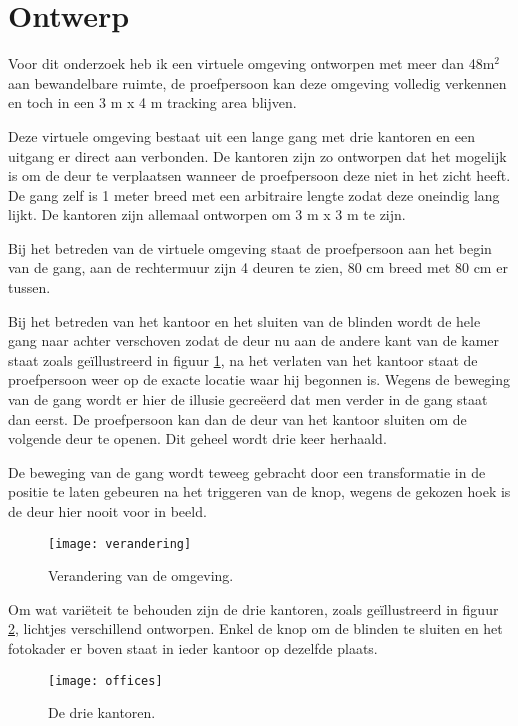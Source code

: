 \section{Ontwerp}
Voor dit onderzoek heb ik een virtuele omgeving ontworpen met meer dan 48m$^2$
aan bewandelbare ruimte, de proefpersoon kan deze omgeving volledig verkennen en
toch in een 3 m x 4 m tracking area blijven.

Deze virtuele omgeving bestaat uit een lange gang met drie kantoren en een 
uitgang er direct aan verbonden. De kantoren zijn zo ontworpen dat het mogelijk 
is om de deur te verplaatsen wanneer de proefpersoon deze niet in het zicht
heeft. De gang zelf is 1 meter breed met een arbitraire lengte zodat deze
oneindig lang lijkt. De kantoren zijn allemaal ontworpen om 3 m x 3 m te zijn.

Bij het betreden van de virtuele omgeving staat de proefpersoon aan het begin van
de gang, aan de rechtermuur zijn 4 deuren te zien, 80 cm breed met 80 cm er
tussen.

Bij het betreden van het kantoor en het sluiten van de blinden wordt de hele 
gang naar achter verschoven zodat de deur nu aan de andere kant van de kamer 
staat zoals ge\"illustreerd in figuur \ref{fig:verandering}, na het verlaten van 
het kantoor staat de proefpersoon weer op de exacte locatie waar hij begonnen is.
Wegens de beweging van de gang wordt er hier de illusie gecre\"eerd dat men
verder in de gang staat dan eerst. De proefpersoon kan dan de deur van het 
kantoor sluiten om de volgende deur te openen. Dit geheel wordt drie keer 
herhaald.

De beweging van de gang wordt teweeg gebracht door een transformatie in de
positie te laten gebeuren na het triggeren van de knop, wegens de gekozen hoek is
de deur hier nooit voor in beeld.

\begin{figure}[p]
    \centering
    \texttt{[image: verandering]}
    \caption{Verandering van de omgeving.}
    \label{fig:verandering}
\end{figure}

Om wat vari\"eteit te behouden zijn de drie kantoren, zoals ge\"illustreerd 
in figuur \ref{fig:kantoren}, lichtjes verschillend ontworpen. Enkel de knop om 
de blinden te sluiten en het fotokader er boven staat in ieder kantoor op 
dezelfde plaats.

\begin{figure}[p]
    \centering
    \texttt{[image: offices]}
    \caption{De drie kantoren.}
    \label{fig:kantoren}
\end{figure}

